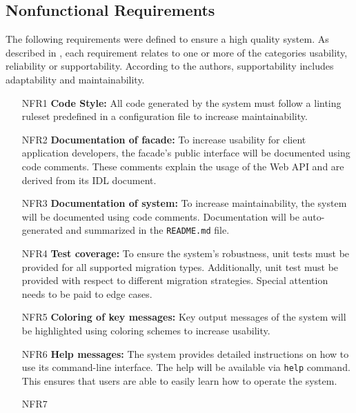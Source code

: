 \subsection{Nonfunctional Requirements}
\label{subsec:NonfunctionalRequirements}
The following requirements were defined to ensure a high quality system. As described in \cite{bruegge_object-oriented_2010}, each requirement relates to one or more of the categories usability, reliability or supportability. According to the authors, supportability includes adaptability and maintainability.

\begin{itemize}[itemindent=-13pt, leftmargin=43pt, align=left]
    \item [NFR1\hphantom{1}]  \textbf{Code Style:} All code generated by the system must follow a linting ruleset predefined in a configuration file to increase maintainability.
    \item [NFR2\hphantom{1}]  \textbf{Documentation of facade:} To increase usability for client application developers, the facade's public interface will be documented using code comments. These comments explain the usage of the Web API and are derived from its IDL document.
    \item [NFR3\hphantom{1}]  \textbf{Documentation of system:} To increase maintainability, the system will be documented using code comments. Documentation will be auto-gen\-erated and summarized in the \texttt{README.md} file.
    \item [NFR4\hphantom{1}]  \textbf{Test coverage:} To ensure the system's robustness, unit tests must be provided for all supported migration types. Additionally, unit test must be provided with respect to different migration strategies. Special attention needs to be paid to edge cases.
    \item [NFR5\hphantom{1}] 
    \textbf{Coloring of key messages:} Key output messages of the system will be highlighted using coloring schemes to increase usability.
    \item [NFR6\hphantom{1}] 
    \textbf{Help messages:} The system provides detailed instructions on how to use its command-line interface. The help will be available via \texttt{help} command. This ensures that users are able to easily learn how to operate the system.
    \item [NFR7\hphantom{1}] 

\end{itemize}
